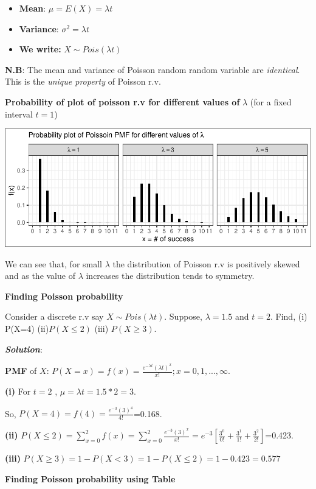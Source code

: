 \documentclass[
]{article}
\begin{document}
\begin{itemize}
\item
  \textbf{Mean}: \(\mu=E(X)=\lambda t\)
\item
  \textbf{Variance}: \(\sigma^2 =\lambda t\)
\item
  \textbf{We write:} \(X\sim Pois(\lambda t)\)
\end{itemize}

\textbf{N.B}: The mean and variance of Poisson random random variable are \emph{identical}. This is the \emph{unique property} of Poisson r.v.

\textbf{Probability of plot of poisson r.v for different values of} \(\lambda\) (for a fixed interval \(t=1\))

\includegraphics{_main_files/figure-latex/unnamed-chunk-4-1.pdf}

We can see that, for small \(\lambda\) the distribution of Poisson r.v is positively skewed and as the value of \(\lambda\) increases the distribution tends to symmetry.

\textbf{Finding Poisson probability}

Consider a discrete r.v say \(X\sim Pois(\lambda t)\). Suppose, \(\lambda =1.5\) and \(t=2\). Find, (i) P(X=4) (ii)\(P(X \le 2)\) (iii) \(P(X\ge3)\).

\textbf{\emph{Solution}}:

\textbf{PMF} of \(X\): \(P(X=x)=f(x)=\frac{e^{-\lambda t}(\lambda t)^x}{x!}; x=0,1,...,\infty.\)

\textbf{(i)} For \(t=2\) , \(\mu=\lambda t=1.5*2=3\).

So, \(P(X=4)=f(4)=\frac{e^{-3}(3)^4}{4!}\)=0.168.

\textbf{(ii)} \(P(X\le2)=\sum_{x=0}^{2}f(x)=\sum_{x=0}^{2}\frac{e^{-3}(3)^x}{x!}=e^{-3}[\frac{3^0}{0!}+\frac{3^1}{1!}+\frac{3^2}{2!}]\)=0.423.

\textbf{(iii)} \(P(X \ge 3)=1-P(X< 3)=1-P(X\le 2)=1-0.423=0.577\)

\textbf{Finding Poisson probability using Table}
\end{document}
